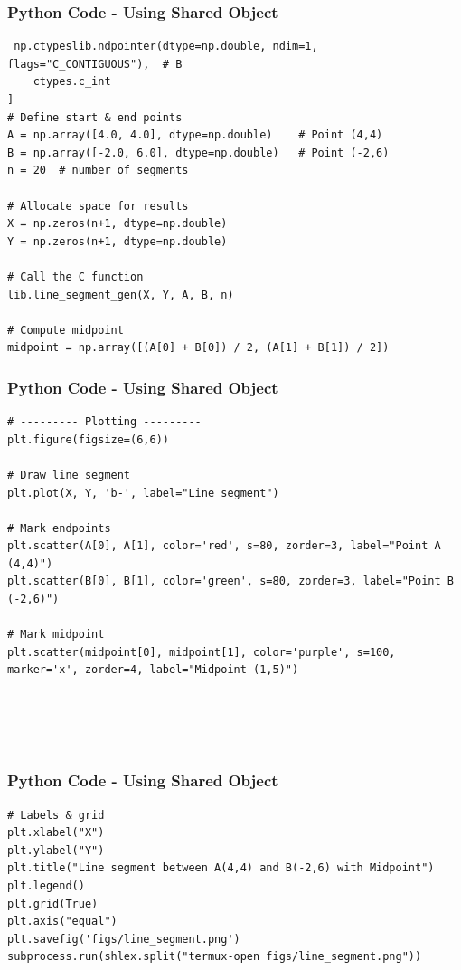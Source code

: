 \documentclass{beamer}
\begin{document}
\begin{frame}[fragile]
    \frametitle{Python Code - Using Shared Object}
    \begin{lstlisting}
 np.ctypeslib.ndpointer(dtype=np.double, ndim=1, flags="C_CONTIGUOUS"),  # B
    ctypes.c_int
]
# Define start & end points
A = np.array([4.0, 4.0], dtype=np.double)    # Point (4,4)
B = np.array([-2.0, 6.0], dtype=np.double)   # Point (-2,6)
n = 20  # number of segments

# Allocate space for results
X = np.zeros(n+1, dtype=np.double)
Y = np.zeros(n+1, dtype=np.double)

# Call the C function
lib.line_segment_gen(X, Y, A, B, n)

# Compute midpoint
midpoint = np.array([(A[0] + B[0]) / 2, (A[1] + B[1]) / 2])

\end{lstlisting}
\end{frame}
\begin{frame}[fragile]
    \frametitle{Python Code - Using Shared Object}
    \begin{lstlisting}
# --------- Plotting ---------
plt.figure(figsize=(6,6))

# Draw line segment
plt.plot(X, Y, 'b-', label="Line segment")

# Mark endpoints
plt.scatter(A[0], A[1], color='red', s=80, zorder=3, label="Point A (4,4)")
plt.scatter(B[0], B[1], color='green', s=80, zorder=3, label="Point B (-2,6)")

# Mark midpoint
plt.scatter(midpoint[0], midpoint[1], color='purple', s=100, marker='x', zorder=4, label="Midpoint (1,5)")





\end{lstlisting}
\end{frame}
\begin{frame}[fragile]
    \frametitle{Python Code - Using Shared Object}
    \begin{lstlisting}
# Labels & grid
plt.xlabel("X")
plt.ylabel("Y")
plt.title("Line segment between A(4,4) and B(-2,6) with Midpoint")
plt.legend()
plt.grid(True)
plt.axis("equal")
plt.savefig('figs/line_segment.png')
subprocess.run(shlex.split("termux-open figs/line_segment.png"))
\end{lstlisting}
\end{frame}
\end{document}
